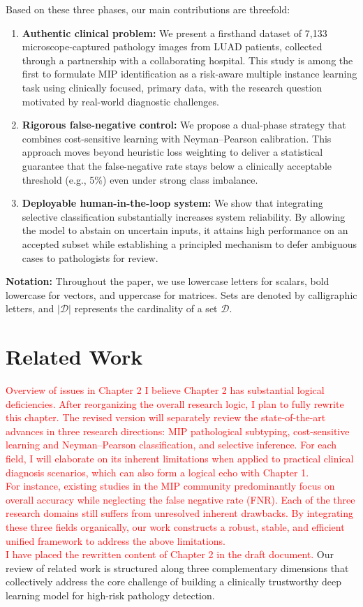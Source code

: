 \documentclass[journal,twoside,web]{ieeecolor}
\begin{document}
Based on these three phases, our main contributions are threefold:
\begin{enumerate}
\item \textbf{Authentic clinical problem:} We present a firsthand dataset of 7,133 microscope-captured pathology images from LUAD patients, collected through a partnership with a collaborating hospital. This study is among the first to formulate MIP identification as a risk-aware multiple instance learning task using clinically focused, primary data, with the research question motivated by real-world diagnostic challenges.
\item \textbf{Rigorous false-negative control:} We propose a dual-phase strategy that combines cost-sensitive learning with Neyman–Pearson calibration. This approach moves beyond heuristic loss weighting to deliver a statistical guarantee that the false-negative rate stays below a clinically acceptable threshold (e.g., 5\%) even under strong class imbalance.
\item \textbf{Deployable human-in-the-loop system:} We show that integrating selective classification substantially increases system reliability. By allowing the model to abstain on uncertain inputs, it attains high performance on an accepted subset while establishing a principled mechanism to defer ambiguous cases to pathologists for review.
\end{enumerate}


\textbf{Notation:}
Throughout the paper, we use lowercase letters for scalars, bold lowercase for vectors, and uppercase for matrices. Sets are denoted by calligraphic letters, and $|\mathcal{D}|$ represents the cardinality of a set $\mathcal{D}$.

\section{Related Work}\label{S6-3}
\textcolor{red}{Overview of issues in Chapter 2
I believe Chapter 2 has substantial logical deficiencies. After reorganizing the overall research logic, I plan to fully rewrite this chapter. The revised version will separately review the state-of-the-art advances in three research directions: MIP pathological subtyping, cost-sensitive learning and Neyman–Pearson classification, and selective inference. For each field, I will elaborate on its inherent limitations when applied to practical clinical diagnosis scenarios, which can also form a logical echo with Chapter 1.\\
For instance, existing studies in the MIP community predominantly focus on overall accuracy while neglecting the false negative rate (FNR). Each of the three research domains still suffers from unresolved inherent drawbacks. By integrating these three fields organically, our work constructs a robust, stable, and efficient unified framework to address the above limitations.\\
I have placed the rewritten content of Chapter 2 in the draft document.}
Our review of related work is structured along three complementary dimensions that collectively address the core challenge of building a clinically trustworthy deep learning model for high-risk pathology detection.
\end{document}
